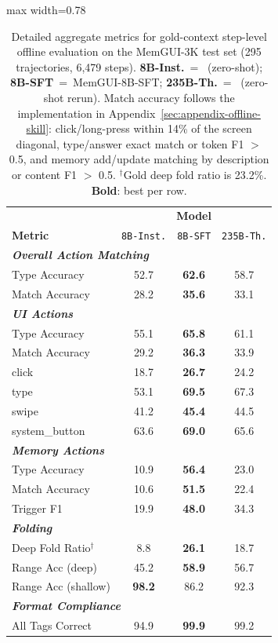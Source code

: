 \documentclass{llmxive}
\providecommand{\llmname}[1]{{\fontfamily{pcr}\selectfont{#1}}}
\providecommand{\arraystretch}{1.06}
\begin{document}
\begin{table}[!htbp]
\centering
\footnotesize
\renewcommand{\arraystretch}{1.04}
\setlength{\tabcolsep}{3.2pt}
\begin{adjustbox}{max width=0.78\linewidth}
\begin{tabular}{l ccc}
\toprule
& \multicolumn{3}{c}{\textbf{Model}} \\
\textbf{Metric} & \texttt{8B-Inst.} & \texttt{8B-SFT} & \texttt{235B-Th.} \\
\midrule
\multicolumn{4}{l}{\textit{\textbf{Overall Action Matching}}} \\
\quad Type Accuracy & 52.7 & \textbf{62.6} & 58.7 \\
\quad Match Accuracy & 28.2 & \textbf{35.6} & 33.1 \\
\midrule
\multicolumn{4}{l}{\textit{\textbf{UI Actions}}} \\
\quad Type Accuracy & 55.1 & \textbf{65.8} & 61.1 \\
\quad Match Accuracy & 29.2 & \textbf{36.3} & 33.9 \\
\quad\quad click & 18.7 & \textbf{26.7} & 24.2 \\
\quad\quad type & 53.1 & \textbf{69.5} & 67.3 \\
\quad\quad swipe & 41.2 & \textbf{45.4} & 44.5 \\
\quad\quad system\_button & 63.6 & \textbf{69.0} & 65.6 \\
\midrule
\multicolumn{4}{l}{\textit{\textbf{Memory Actions}}} \\
\quad Type Accuracy & 10.9 & \textbf{56.4} & 23.0 \\
\quad Match Accuracy & 10.6 & \textbf{51.5} & 22.4 \\
\quad Trigger F1 & 19.9 & \textbf{48.0} & 34.3 \\
\midrule
\multicolumn{4}{l}{\textit{\textbf{Folding}}} \\
\quad Deep Fold Ratio$^\dagger$ & 8.8 & \textbf{26.1} & 18.7 \\
\quad Range Acc (deep) & 45.2 & \textbf{58.9} & 56.7 \\
\quad Range Acc (shallow) & \textbf{98.2} & 86.2 & 92.3 \\
\midrule
\multicolumn{4}{l}{\textit{\textbf{Format Compliance}}} \\
\quad All Tags Correct & 94.9 & \textbf{99.9} & 99.2 \\
\bottomrule
\end{tabular}
\end{adjustbox}
\caption{Detailed aggregate metrics for gold-context step-level offline evaluation on the MemGUI-3K test set (295 trajectories, 6{,}479 steps). \textbf{8B-Inst.}~=~\llmname{Qwen3-VL-8B-Instruct} (zero-shot); \textbf{8B-SFT}~=~MemGUI-8B-SFT; \textbf{235B-Th.}~=~\llmname{Qwen3-VL-235B-Thinking} (zero-shot rerun). Match accuracy follows the implementation in Appendix~\ref{sec:appendix-offline-skill}: click/long-press within 14\% of the screen diagonal, type/answer exact match or token F1 $>$ 0.5, and memory add/update matching by description or content F1 $>$ 0.5. $^\dagger$Gold deep fold ratio is 23.2\%. \textbf{Bold}: best per row.}
\label{tab:offline-eval-detailed}
\end{table}
\end{document}
